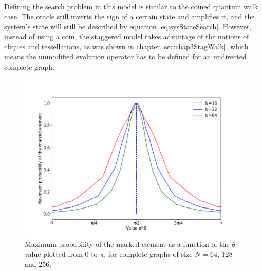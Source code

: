 \documentclass[../../dissertation.tex]{subfiles}
\begin{document}
Defining the search problem in this model is similar to the
coined quantum walk case. The oracle still inverts the sign of a certain state
and amplifies it, and the system's state will still be described by equation
\eqref{eq:sysStateSearch}. However, instead of using a coin, the staggered model
takes advantage of the notions of cliques and tessellations, as was shown in
chapter \ref{sec:chap3StagWalk}, which means the unmodified evolution operator
has to be defined for an undirected complete graph.
\begin{figure}[!h]
	\centering
	\includegraphics[scale=0.40]{img/StagQuantumWalk/Search/Theta163264.png}
	\caption{Maximum probability of the marked element as a function of the $\theta$ value plotted from $0$ to $\pi$, for complete graphs of size $N=64$, $128$ and $256$.} 
	\label{fig:stagMultTheta}
\end{figure}\par
\end{document}
